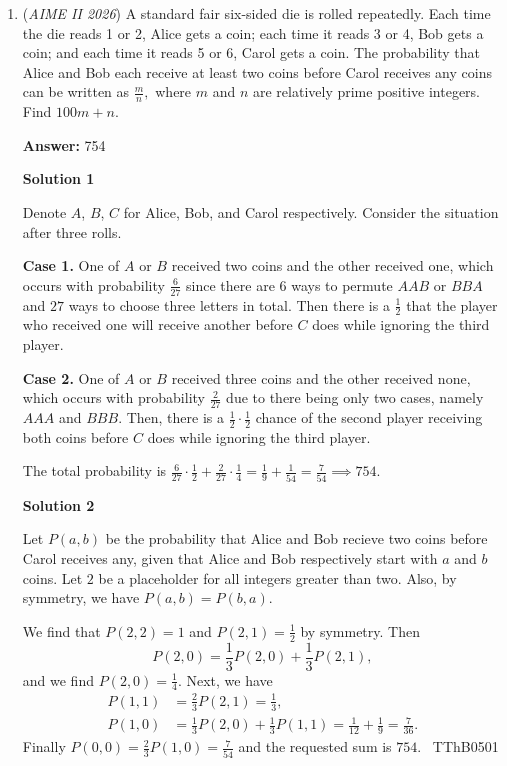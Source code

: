 \begin{enumerate}
 
We conclude that the sum we are seeking is $50$, keyed as $\boxed{050}$.

 


	\item (\textit{AIME II 2026}) A standard fair six-sided die is rolled repeatedly. Each time the die reads 1 or 2, Alice gets a coin; each time it reads 3 or 4, Bob gets a coin; and each time it reads 5 or 6, Carol gets a coin. The probability that Alice and Bob each receive at least two coins before Carol receives any coins can be written as $\frac mn,$ where $m$ and $n$ are relatively prime positive integers. Find $100m+n.$

 \textbf{Answer: }754



\textbf{Solution 1}

Denote $A$, $B$, $C$ for Alice, Bob, and Carol respectively. Consider the situation after three rolls.

 \textbf{Case 1.} One of $A$ or $B$ received two coins and the other received one, which occurs with probability $\frac{6}{27}$ since there are $6$ ways to permute $AAB$ or $BBA$ and $27$ ways to choose three letters in total. Then there is a $\frac{1}{2}$ that the player who received one will receive another before $C$ does while ignoring the third player.

 \textbf{Case 2.} One of $A$ or $B$ received three coins and the other received none, which occurs with probability $\frac{2}{27}$ due to there being only two cases, namely $AAA$ and $BBB$. Then, there is a $\frac{1}{2}\cdot\frac{1}{2}$ chance of the second player receiving both coins before $C$ does while ignoring the third player.

 The total probability is $\frac{6}{27}\cdot\frac{1}{2}+\frac{2}{27}\cdot\frac{1}{4}=\frac{1}{9}+\frac{1}{54}=\frac{7}{54}\implies\boxed{754}$.

 



\textbf{Solution 2}

Let $P(a,b)$ be the probability that Alice and Bob recieve two coins before Carol receives any, given that Alice and Bob respectively start with $a$ and $b$ coins. Let $2$ be a placeholder for all integers greater than two. Also, by symmetry, we have $P(a,b)=P(b,a)$.

 We find that $P(2,2)=1$ and $P(2,1) = \frac{1}{2}$ by symmetry. Then 
 \[P(2,0) = \frac{1}{3}P(2,0) + \frac{1}{3}P(2,1),\]and we find $P(2,0)=\frac{1}{4}$. Next, we have \begin{align*}P(1,1) &= \frac{2}{3}P(2,1) = \frac{1}{3},\\P(1,0) &= \frac{1}{3}P(2,0)+\frac{1}{3}P(1,1) = \frac{1}{12}+\frac{1}{9} = \frac{7}{36}.\end{align*}
Finally $P(0,0) = \frac{2}{3}P(1,0)=\frac{7}{54}$ and the requested sum is $\boxed{754}$. ~TThB0501


\end{enumerate}

